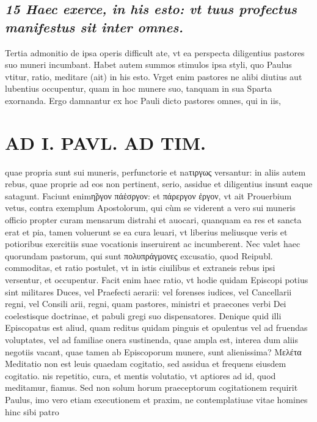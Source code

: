 \documentclass{article}
\begin{document}
\begin{pages}
\subsection*{\textit{15 Haec exerce, in his esto: vt tuus profectus manifestus sit inter omnes. }}\pstart Tertia admonitio de ipsa operis difficult ate, vt ea perspecta diligentius pastores suo muneri incumbant. Habet autem summos stimulos ipsa styli, quo Paulus vtitur, ratio, meditare (ait) in his esto. Vrget enim pastores ne alibi diutius aut lubentius occupentur, quam in hoc munere suo, tanquam in sua Sparta exornanda. Ergo damnantur ex hoc Pauli dicto pastores omnes, qui in iis,  \pend
\section*{AD I. PAVL. AD TIM. }
\marginpar{[ p.430 ]}\pstart quae propria sunt sui muneris, perfunctorie et naτιργως versantur: in aliis autem rebus, quae proprie ad eos non pertinent, serio, assidue et diligentius insunt eaque satagunt. Faciunt enimη̃ργον πάἑσργον: et πάρεργον ἐργον, vt ait Prouerbium vetus, contra exemplum Apostolorum, qui cùm se viderent a vero sui muneris officio propter curam mensarum distrahi et auocari, quanquam ea res et sancta erat et pia, tamen voluerunt se ea cura leuari, vt liberius meliusque veris et potioribus exercitiis suae vocationis inseruirent ac incumberent. Nec valet haec quorundam pastorum, qui sunt πολυπράγμονες excusatio, quod Reipubl. commoditas, et ratio postulet, vt in istis ciuilibus et extraneis rebus ipsi versentur, et occupentur. Facit enim haec ratio, vt hodie quidam Episcopi potius sint militares Duces, vel Praefecti aerarii: vel forenses iudices, vel Cancellarii regni, vel Consili arii, regni, quam pastores, ministri et praecones verbi Dei coelestisque doctrinae, et pabuli gregi suo dispensatores. Denique quid illi Episcopatus est aliud, quam reditus quidam pinguis et opulentus vel ad fruendas voluptates, vel ad familiae onera sustinenda, quae ampla est, interea dum aliis negotiis vacant, quae tamen ab Episcoporum munere, sunt alienissima?  \pend\pstart Μελέτα Meditatio non est leuis quaedam cogitatio, sed assidua et frequens eiusdem cogitatio. nis repetitio, cura, et mentis volutatio, vt aptiores ad id, quod meditamur, fiamus. Sed non solum horum praeceptorum cogitationem requirit Paulus, imo vero etiam executionem et praxim, ne contemplatiuae vitae homines hinc sibi patro\pend

\end{pages}
\end{document}
